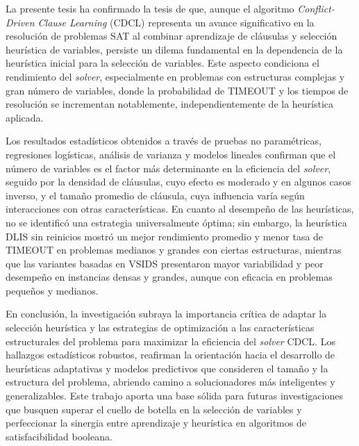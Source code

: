 \begin{conclusions}
La presente tesis ha confirmado la tesis de que, aunque el algoritmo \textit{Conflict-Driven Clause Learning} (CDCL) representa un avance significativo en la resolución de problemas SAT al combinar aprendizaje de cláusulas y selección heurística de variables, persiste un dilema fundamental en la dependencia de la heurística inicial para la selección de variables. Este aspecto condiciona el rendimiento del \textit{solver}, especialmente en problemas con estructuras complejas y gran número de variables, donde la probabilidad de TIMEOUT y los tiempos de resolución se incrementan notablemente, independientemente de la heurística aplicada.

Los resultados estadísticos obtenidos a través de pruebas no paramétricas, regresiones logísticas, análisis de varianza y modelos lineales confirman que el número de variables es el factor más determinante en la eficiencia del \textit{solver}, seguido por la densidad de cláusulas, cuyo efecto es moderado y en algunos casos inverso, y el tamaño promedio de cláusula, cuya influencia varía según interacciones con otras características. En cuanto al desempeño de las heurísticas, no se identificó una estrategia universalmente óptima; sin embargo, la heurística DLIS sin reinicios mostró un mejor rendimiento promedio y menor tasa de TIMEOUT en problemas medianos y grandes con ciertas estructuras, mientras que las variantes basadas en VSIDS presentaron mayor variabilidad y peor desempeño en instancias densas y grandes, aunque con eficacia en problemas pequeños y medianos.

En conclusión, la investigación subraya la importancia crítica de adaptar la selección heurística y las estrategias de optimización a las características estructurales del problema para maximizar la eficiencia del \textit{solver} CDCL. Los hallazgos estadísticos robustos, reafirman la orientaci\'on hacia el desarrollo de heurísticas adaptativas y modelos predictivos que consideren el tamaño y la estructura del problema, abriendo camino a solucionadores más inteligentes y generalizables. Este trabajo aporta una base sólida para futuras investigaciones que busquen superar el cuello de botella en la selección de variables y perfeccionar la sinergia entre aprendizaje y heurística en algoritmos de satisfacibilidad booleana.

\end{conclusions}
